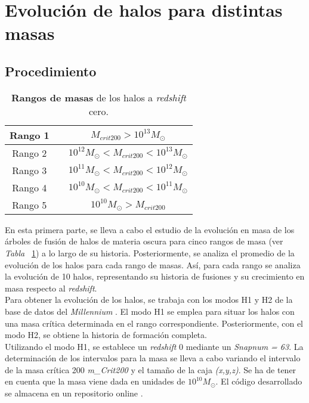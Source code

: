 \section{Evolución de halos para distintas masas} 
\label{sec:2} %

\subsection{Procedimiento}
\label{subsec:2_A}

\begin{table}[H]
\begin{center}
\begin{tabular}{ccc}
\toprule
\cellcolor[gray]{0.9}Rango 1 & & $M_{crit200}>10^{13}M_\odot$ \\
\midrule
\cellcolor[gray]{0.9}Rango 2 & & $10^{12}M_\odot<M_{crit200}<10^{13}M_\odot$ \\
\midrule
\cellcolor[gray]{0.9}Rango 3 & & $10^{11}M_\odot<M_{crit200}<10^{12}M_\odot$ \\
\midrule
\cellcolor[gray]{0.9}Rango 4 & & $10^{10}M_\odot<M_{crit200}<10^{11}M_\odot$ \\
\midrule
\cellcolor[gray]{0.9}Rango 5 & & $10^{10}M_\odot>M_{crit200}$ \\
\bottomrule
\end{tabular}
\end{center}
\caption{\textbf{Rangos de masas} de los halos a \textit{redshift} cero.}
\label{tab:tabla2}
\end{table}

En esta primera parte, se lleva a cabo el estudio de la evolución en masa de los árboles de fusión de halos de materia oscura para cinco rangos de masa (ver \textit{Tabla} ~\ref{tab:tabla2}) a lo largo de su historia. Posteriormente, se analiza el promedio de la evolución de los halos para cada rango de masas. Así, para cada rango se analiza la evolución de 10 halos, representando su historia de fusiones y su crecimiento en masa respecto al \textit{redshift}.   \\

Para obtener la evolución de los halos, se trabaja con los modos H1 y H2 de la base de datos del \textit{Millennium} \cite{6}. El modo H1 se emplea para situar los halos con una masa crítica determinada en el rango correspondiente. Posteriormente, con el modo H2, se obtiene la historia de formación completa. \\

Utilizando el modo H1, se establece un \textit{redshift} 0 mediante un \textit{Snapnum = 63}. La determinación de los intervalos para la masa se lleva a cabo variando el intervalo de la masa crítica 200 \textit{m_Crit200} y el tamaño de la caja \textit{(x,y,z)}. Se ha de tener en cuenta que la masa viene dada en unidades de $10^{10}M_\odot$. El código desarrollado se almacena en un repositorio online \cite{9}. \\

